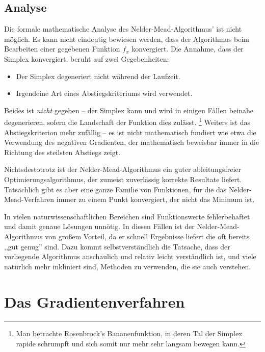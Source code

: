 \documentclass[naustrian]{article}
\begin{document}
{\subsection{Analyse}

Die formale mathematische Analyse des Nelder-Mead-Algorithmus' ist nicht möglich.
Es kann nicht eindeutig bewiesen werden, dass der Algorithmus beim Bearbeiten einer gegebenen
Funktion $f_x$ konvergiert. Die Annahme, dass der Simplex konvergiert, beruht auf zwei
Gegebenheiten:

\begin{itemize}
\item Der Simplex degeneriert nicht während der Laufzeit.
\item Irgendeine Art eines Abstiegskriteriums wird verwendet.
\end{itemize}

Beides ist \emph{nicht} gegeben -- der Simplex kann und wird in einigen Fällen
beinahe degenerieren, sofern die Landschaft der Funktion dies
zulässt.
\footnote{Man betrachte Rosenbrock's Bananenfunktion, in deren Tal der Simplex rapide schrumpft und sich somit nur mehr sehr langsam bewegen kann.}
Weiters ist das Abstiegskriterion mehr zufällig -- es ist nicht mathematisch
fundiert wie etwa die Verwendung des negativen Gradienten, der mathematisch beweisbar
immer in die Richtung des steilsten Abstiegs zeigt. ~\cite{nelder-mead-scholarpedia}

Nichtsdestotrotz ist der Nelder-Mead-Algorithmus ein guter ableitungsfreier
Optimierungsalgorithmus, der zumeist zuverlässig korrekte Resultate liefert.
Tatsächlich gibt es aber eine ganze Familie von Funktionen, für die das Nelder-Mead-Verfahren
immer zu einem Punkt konvergiert, der nicht das Minimum ist.~\cite{nelder-mead-convergence}

In vielen naturwissenschaftlichen Bereichen sind Funktionswerte fehlerbehaftet und damit
genaue Lösungen unnötig. In diesen Fällen ist der Nelder-Mead-Algorithmus von großem
Vorteil, da er schnell Ergebnisse liefert die oft bereits ,,gut genug'' sind.
Dazu kommt selbstverständlich die Tatsache, dass der vorliegende Algorithmus anschaulich
und relativ leicht verständlich ist, und viele natürlich mehr inkliniert sind, Methoden
zu verwenden, die sie auch verstehen.

\section{Das Gradientenverfahren}

}
\end{document}
